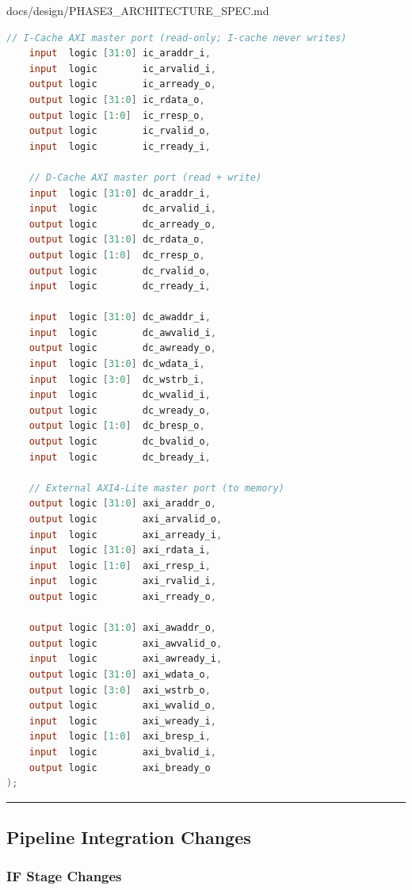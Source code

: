 \begin{relocated}{docs/design/PHASE3_ARCHITECTURE_SPEC.md}
\begin{lstlisting}[language=Verilog]
    // I-Cache AXI master port (read-only; I-cache never writes)
    input  logic [31:0] ic_araddr_i,
    input  logic        ic_arvalid_i,
    output logic        ic_arready_o,
    output logic [31:0] ic_rdata_o,
    output logic [1:0]  ic_rresp_o,
    output logic        ic_rvalid_o,
    input  logic        ic_rready_i,

    // D-Cache AXI master port (read + write)
    input  logic [31:0] dc_araddr_i,
    input  logic        dc_arvalid_i,
    output logic        dc_arready_o,
    output logic [31:0] dc_rdata_o,
    output logic [1:0]  dc_rresp_o,
    output logic        dc_rvalid_o,
    input  logic        dc_rready_i,

    input  logic [31:0] dc_awaddr_i,
    input  logic        dc_awvalid_i,
    output logic        dc_awready_o,
    input  logic [31:0] dc_wdata_i,
    input  logic [3:0]  dc_wstrb_i,
    input  logic        dc_wvalid_i,
    output logic        dc_wready_o,
    output logic [1:0]  dc_bresp_o,
    output logic        dc_bvalid_o,
    input  logic        dc_bready_i,

    // External AXI4-Lite master port (to memory)
    output logic [31:0] axi_araddr_o,
    output logic        axi_arvalid_o,
    input  logic        axi_arready_i,
    input  logic [31:0] axi_rdata_i,
    input  logic [1:0]  axi_rresp_i,
    input  logic        axi_rvalid_i,
    output logic        axi_rready_o,

    output logic [31:0] axi_awaddr_o,
    output logic        axi_awvalid_o,
    input  logic        axi_awready_i,
    output logic [31:0] axi_wdata_o,
    output logic [3:0]  axi_wstrb_o,
    output logic        axi_wvalid_o,
    input  logic        axi_wready_i,
    input  logic [1:0]  axi_bresp_i,
    input  logic        axi_bvalid_i,
    output logic        axi_bready_o
);
\end{lstlisting}

\begin{center}\rule{0.5\linewidth}{0.5pt}\end{center}

\subsection{Pipeline Integration Changes}\label{ds:ch:phase3-architecture:7-pipeline-integration-changes}

\subsubsection{IF Stage Changes}\label{ds:ch:phase3-architecture:71-if-stage-changes}


\end{relocated}
